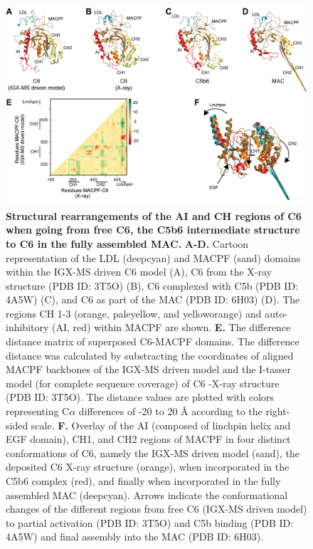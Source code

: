 \begin{subappendices}
\begin{figure}[hbt]
        \label{fig:ch2_app_fig6}
    \end{figure}
    \begin{figure}[hbt]
        \center
        \includegraphics[]{Chapter.2/Figures/EV_Figure2.png}
        \caption{\textbf{Structural rearrangements of the AI and CH regions of C6 when going from free C6, the C5b6 intermediate structure to C6 in the fully assembled MAC.} \textbf{A-D.} Cartoon representation of the LDL (deepcyan) and MACPF (sand) domains within the IGX-MS driven C6 model (A), C6 from the X-ray structure (PDB ID: 3T5O) (B), C6 complexed with C5b (PDB ID: 4A5W) (C), and C6 as part of the MAC (PDB ID: 6H03) (D). The regions CH 1-3 (orange, paleyellow, and yelloworange) and auto-inhibitory (AI, red) within MACPF are shown. \textbf{E.} The difference distance matrix of superposed C6-MACPF domains. The difference distance was calculated by substracting the coordinates of aligned MACPF backbones of the IGX-MS driven model and the I-tasser model (for complete sequence coverage) of C6 -X-ray structure (PDB ID: 3T5O). The distance values are plotted with colors representing C$\alpha$ differences of -20 to 20 Å according to the right-sided scale. \textbf{F.} Overlay of the AI (composed of linchpin helix and EGF domain), CH1, and CH2 regions of MACPF in four distinct conformations of C6, namely the IGX-MS driven model (sand), the deposited C6 X-ray structure (orange), when incorporated in the C5b6 complex (red), and finally when incorporated in the fully assembled MAC (deepcyan). Arrows indicate the conformational changes of the different regions from free C6 (IGX-MS driven model) to partial activation (PDB ID: 3T5O) and C5b binding (PDB ID: 4A5W) and final assembly into the MAC (PDB ID: 6H03).}
        \label{fig:ch2_app_fig7}

\end{figure}
\end{subappendices}
